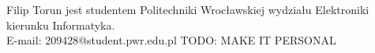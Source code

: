 \documentclass[10pt,journal,compsoc]{IEEEtran}
\begin{document}
\begin{IEEEbiography}{Filip Torun}
jest studentem Politechniki Wrocławskiej wydziału Elektroniki kierunku Informatyka. \\
E-mail: 209428@student.pwr.edu.pl
TODO: MAKE IT PERSONAL
\end{IEEEbiography}

\end{document}
